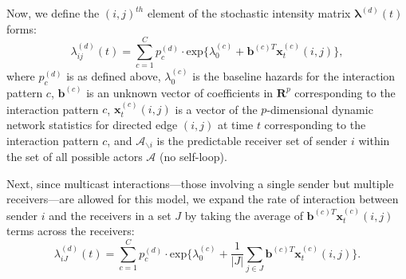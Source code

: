 \documentclass[a4paper]{article}
\begin{document}
Now, we define the $(i, j)^{th}$ element of the stochastic intensity matrix $\boldsymbol{\lambda}^{(d)}(t)$ forms:
\begin{equation}
\lambda^{(d)}_{ij}(t)=\sum\limits_{c=1}^{C} p^{(d)}_c
\cdot  \mbox{exp}\Big\{\lambda^{(c)}_0 + \boldsymbol{b}^{(c)T}\boldsymbol{x}^{(c)}_t(i, j)\Big\},
\end{equation}
where $p_c^{(d)}$ is as defined above, $\lambda^{(c)}_0$ is the baseline hazards for the interaction pattern $c$, $\boldsymbol{b}^{(c)}$ is an unknown vector of coefficients in $\boldsymbol{R}^{p}$ corresponding to the interaction pattern $c$, $\boldsymbol{x}^{(c)}_t(i, j)$ is a vector of the $p$-dimensional dynamic network statistics for directed edge $(i, j)$ at time $t$ corresponding to the interaction pattern $c$, and $\mathcal{A}_{\backslash i}$ is the predictable receiver set of sender $i$ within the set of all possible actors $\mathcal{A}$ (no self-loop). 

Next, since multicast interactions—those involving a single sender but multiple
receivers—are allowed for this model, we expand the rate of interaction between sender $i$ and the receivers in a set $J$ by taking the average of $\boldsymbol{b}^{(c)T}\boldsymbol{x}^{(c)}_t(i, j)$ terms across the receivers:
\begin{equation}
\lambda^{(d)}_{iJ}(t)= \sum\limits_{c=1}^{C} p^{(d)}_c\cdot\mbox{exp}\Big\{\lambda^{(c)}_0+\frac{1}{|J|}\sum\limits_{j \in J} \boldsymbol{b}^{(c)T}\boldsymbol{x}^{(c)}_t(i, j)\Big\}.
\end{equation}
\end{document}
